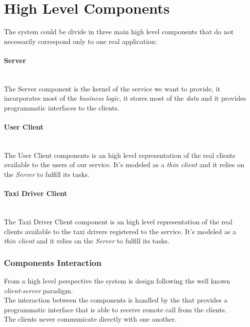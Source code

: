 \section{High Level Components} %
\label{sec:high_level_components}
The system could be divide in three main high level components that do not necessarily correspond only to one real application:
\paragraph{Server} %
\label{comp:server}\hfill \\
The Server component is the kernel of the service we want to provide, it incorporates most of the \emph{business logic}, it stores most of the \emph{data} and it provides programmatic interfaces to the clients.
\paragraph{User Client} %
\label{comp:user_client}\hfill \\
The User Client components is an high level representation of the real clients available to the users of our service. It's modeled as a \emph{thin client} and it relies on the \emph{Server} to fulfill its tasks.
\paragraph{Taxi Driver Client} %
\label{par:taxi_driver_client}\hfill \\
The Taxi Driver Client component is an high level representation of the real clients available to the taxi drivers registered to the service. It's modeled as a \emph{thin client} and it relies on the \emph{Server} to fulfill its tasks.


\subsubsection{Components Interaction} %
\label{ssub:components_interaction}
From a high level perspective the system is design following the well known \emph{client-server} paradigm.\\
The interaction between the components is handled by the  that provides a programmatic interface that is able to receive remote call from the clients.\\
The clients never communicate directly with one another.
